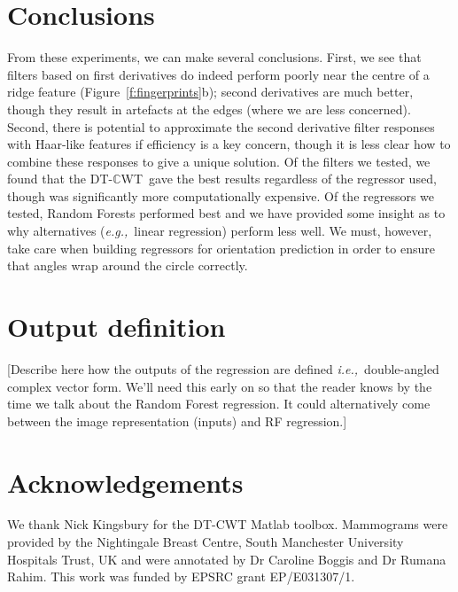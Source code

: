 \documentclass[a4paper]{report}
\def\eg{\emph{e.g.,}}
\def\ie{\emph{i.e.,}}
\newcommand{\fref}[1]{Figure~\ref{#1}}
\def\dtcwt{DT-$\mathbb{C}$WT}
\begin{document}
\section{Conclusions}
From these experiments, we can make several conclusions. First, we see that filters based on first derivatives do indeed perform poorly near the centre of a ridge feature (\fref{f:fingerprints}b); second derivatives are much better, though they result in artefacts at the edges (where we are less concerned). Second, there is potential to approximate the second derivative filter responses with Haar-like features if efficiency is a key concern, though it is less clear how to combine these responses to give a unique solution. Of the filters we tested, we found that the \dtcwt~gave the best results regardless of the regressor used, though was significantly more computationally expensive. Of the regressors we tested, Random Forests performed best and we have provided some insight as to why alternatives (\eg~linear regression) perform less well. We must, however, take care when building regressors for orientation prediction in order to ensure that angles wrap around the circle correctly.


\section{Output definition}
[Describe here how the outputs of the regression are defined \ie~double-angled complex vector form. We'll need this early on so that the reader knows by the time we talk about the Random Forest regression. It could alternatively come between the image representation (inputs) and RF regression.]



%
%
%




\section*{Acknowledgements}
We thank Nick Kingsbury for the DT-CWT Matlab toolbox. Mammograms were provided by the Nightingale Breast Centre, South Manchester University Hospitals Trust, UK and were annotated by Dr Caroline Boggis and Dr Rumana Rahim. This work was funded by EPSRC grant EP/E031307/1.



\end{document}
